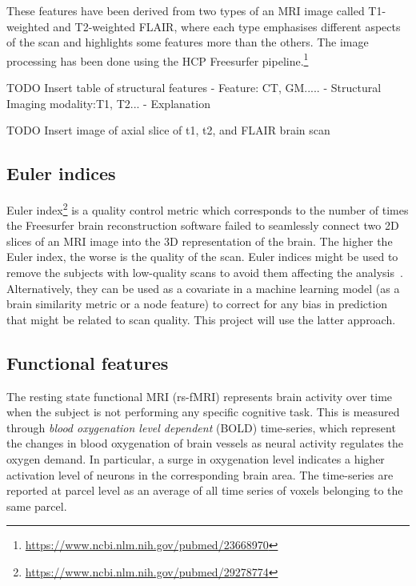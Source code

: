 These features have been derived from two types of an MRI image called T1-weighted and T2-weighted FLAIR, where each type emphasises different aspects of the scan and highlights some features more than the others. The image processing has been done using the HCP Freesurfer pipeline.\footnote{\url{https://www.ncbi.nlm.nih.gov/pubmed/23668970}} 

TODO Insert table of structural features
- Feature: CT, GM.....
- Structural Imaging modality:T1, T2...
- Explanation

TODO Insert image of axial slice of t1, t2, and FLAIR brain scan


\subsection{Euler indices}
Euler index\footnote{\url{https://www.ncbi.nlm.nih.gov/pubmed/29278774}} is a quality control metric which corresponds to the number of times the Freesurfer brain reconstruction software failed to seamlessly connect two 2D slices of an MRI image into the 3D representation of the brain. The higher the Euler index, the worse is the quality of the scan. Euler indices might be used to remove the subjects with low-quality scans to avoid them affecting the analysis~\cite{kaufmann2019}. Alternatively, they can be used as a covariate in a machine learning model (as a brain similarity metric or a node feature) to correct for any bias in prediction that might be related to scan quality. This project will use the latter approach.

\subsection{Functional features}
\label{fmri}

The resting state functional MRI (rs-fMRI) represents brain activity over time when the subject is not performing any specific cognitive task. This is measured through \textit{blood oxygenation level dependent} (BOLD) time-series, which represent the changes in blood oxygenation of brain vessels as neural activity regulates the oxygen demand. In particular, a surge in oxygenation level indicates a higher activation level of neurons in the corresponding brain area. The time-series are reported at parcel level as an average of all time series of voxels belonging to the same parcel. 

